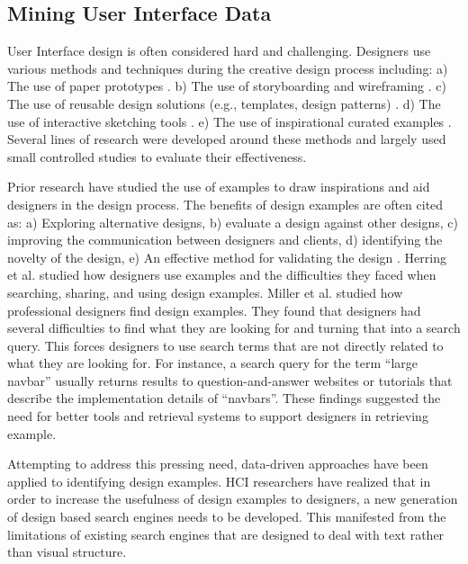 \subsection{Mining User Interface Data}
User Interface design is often considered hard and challenging. Designers use various methods and techniques during the creative design process including: a) The use of paper prototypes \cite{newman_2000_DIS, klemmer_2001_UIST}. 
b) The use of storyboarding and wireframing \cite{newman_2000_DIS, wahid_2011_CHI}. 
c) The use of reusable design solutions (e.g., templates, design patterns) \cite{jacobs_2003_TOG, gibson_2005_WWW, ritchie_2011_CHI}.
d) The use of interactive sketching tools \cite{landay_1995_CHI, lin_2002_CHI, Newman_2003_HCI, sezgin_2006_GRAPH}.
e) The use of inspirational curated examples \cite{purcell_1992_KBS, herring_2009_CHI, lee_2010_CHI, ritchie_2011_CHI, miller_2014_ASME}.
Several lines of research were developed around these methods and largely used small controlled studies to evaluate their effectiveness.

Prior research have studied the use of examples to draw inspirations and aid designers in the design process.
The benefits of design examples are often cited as: 
a) Exploring alternative designs, 
b) evaluate a design against other designs, 
c) improving the communication between designers and clients, 
d) identifying the novelty of the design, 
e) An effective method for validating the design \cite{purcell_1992_KBS, herring_2009_CHI, lee_2010_CHI, ritchie_2011_CHI, chang_2012_CHI, miller_2014_ASME}.
Herring et al. \cite{herring_2009_CHI} studied how designers use examples and the difficulties they faced when searching, sharing, and using design examples.
Miller et al. \cite{miller_2014_ASME} studied how professional designers find design examples.
They found that designers had several difficulties to find what they are looking for and turning that into a search query.
This forces designers to use search terms that are not directly related to what they are looking for.
For instance, a search query for the term ``large navbar'' usually returns results to question-and-answer websites or tutorials that describe the implementation details of ``navbars''.
These findings suggested the need for better tools and retrieval systems to support designers in retrieving example.


Attempting to address this pressing need, data-driven approaches have been applied to identifying design examples.
HCI researchers have realized that in order to increase the usefulness of design examples to designers, a new generation of design based search engines needs to be developed.
This manifested from the limitations of existing search engines that are designed to deal with text rather than visual structure.

